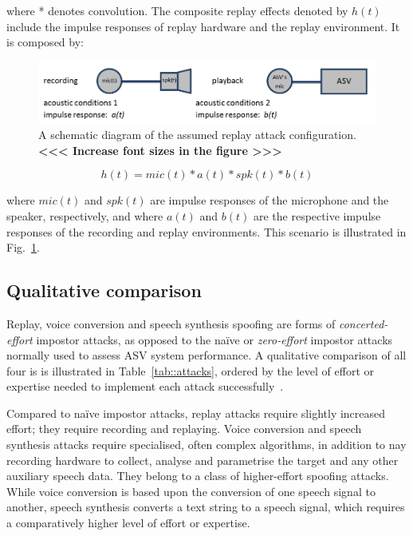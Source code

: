 \noindent where * denotes convolution.  The composite replay effects denoted by $h(t)$ include the impulse responses of replay hardware and the replay environment.  It is composed by:


\begin{figure}
	\includegraphics[width=1\linewidth]{Figs/replay.png}
	\caption{A schematic diagram of the assumed replay attack configuration. {\bfseries <<< Increase font sizes in the figure >>>}}
	\label{fig::Replay}
\end{figure}

\begin{equation}
h(t) = mic(t) * a(t) * spk(t) * b(t)
\label{eq::playback}
\end{equation}


\noindent where $mic(t)$ and $spk(t)$ are impulse responses of the microphone and the speaker, respectively, and where $a(t)$ and $b(t)$ are the respective impulse responses of the recording and replay environments.  This scenario is illustrated in Fig.~\ref{fig::Replay}.



\subsection{Qualitative comparison}
\label{sec::algorithms::comparison}

Replay, voice conversion and speech synthesis spoofing are forms of \emph{concerted-effort} impostor attacks, as opposed to the na\"{i}ve or \emph{zero-effort} impostor attacks normally used to assess ASV system performance.  A qualitative comparison of all four is is illustrated in Table~\ref{tab::attacks}, ordered by the level of effort or expertise needed to implement each attack successfully~\cite{Wu2014a}. 

Compared to na\"{i}ve impostor attacks, replay attacks require slightly increased effort; they require recording and replaying. Voice conversion and speech synthesis attacks require specialised, often complex algorithms, in addition to nay recording hardware to collect, analyse and parametrise the target and any other auxiliary speech data.  They belong to a class of higher-effort spoofing attacks.  While voice conversion is based upon the conversion of one speech signal to another, speech synthesis converts a text string to a speech signal, which requires a comparatively higher level of effort or expertise.

